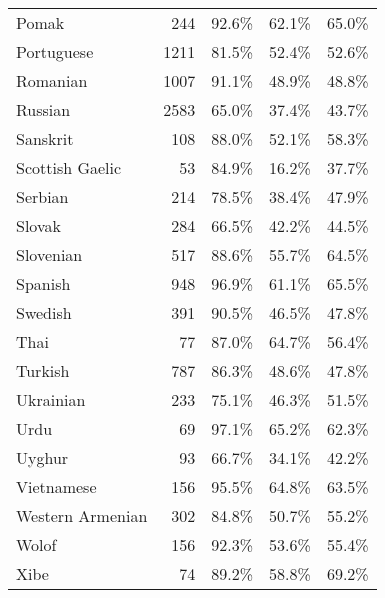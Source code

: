 \begin{longtable}{lrrrr}
    Pomak & 244 & 92.6\% & 62.1\% & 65.0\% \\
    Portuguese & 1211 & 81.5\% & 52.4\% & 52.6\% \\
    Romanian & 1007 & 91.1\% & 48.9\% & 48.8\% \\
    Russian & 2583 & 65.0\% & 37.4\% & 43.7\% \\
    Sanskrit & 108 & 88.0\% & 52.1\% & 58.3\% \\
    Scottish Gaelic & 53 & 84.9\% & 16.2\% & 37.7\% \\
    Serbian & 214 & 78.5\% & 38.4\% & 47.9\% \\
    Slovak & 284 & 66.5\% & 42.2\% & 44.5\% \\
    Slovenian & 517 & 88.6\% & 55.7\% & 64.5\% \\
    Spanish & 948 & 96.9\% & 61.1\% & 65.5\% \\
    Swedish & 391 & 90.5\% & 46.5\% & 47.8\% \\
    Thai & 77 & 87.0\% & 64.7\% & 56.4\% \\
    Turkish & 787 & 86.3\% & 48.6\% & 47.8\% \\
    Ukrainian & 233 & 75.1\% & 46.3\% & 51.5\% \\
    Urdu & 69 & 97.1\% & 65.2\% & 62.3\% \\
    Uyghur & 93 & 66.7\% & 34.1\% & 42.2\% \\
    Vietnamese & 156 & 95.5\% & 64.8\% & 63.5\% \\
    Western Armenian & 302 & 84.8\% & 50.7\% & 55.2\% \\
    Wolof & 156 & 92.3\% & 53.6\% & 55.4\% \\
    Xibe & 74 & 89.2\% & 58.8\% & 69.2\% \\
\end{longtable}
    